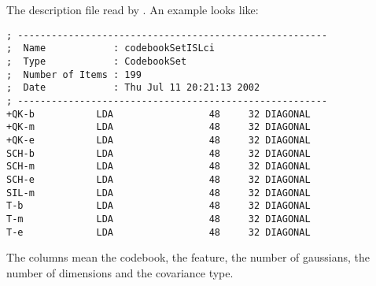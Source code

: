 
\section{}

The description file read by . An example
looks like:

\begin{verbatim}
; -------------------------------------------------------
;  Name            : codebookSetISLci
;  Type            : CodebookSet
;  Number of Items : 199
;  Date            : Thu Jul 11 20:21:13 2002
; -------------------------------------------------------
+QK-b           LDA                 48     32 DIAGONAL
+QK-m           LDA                 48     32 DIAGONAL
+QK-e           LDA                 48     32 DIAGONAL
SCH-b           LDA                 48     32 DIAGONAL
SCH-m           LDA                 48     32 DIAGONAL
SCH-e           LDA                 48     32 DIAGONAL
SIL-m           LDA                 48     32 DIAGONAL
T-b             LDA                 48     32 DIAGONAL
T-m             LDA                 48     32 DIAGONAL
T-e             LDA                 48     32 DIAGONAL
\end{verbatim}

The columns mean the codebook, the feature, the number of gaussians,
the number of dimensions and the covariance type.

